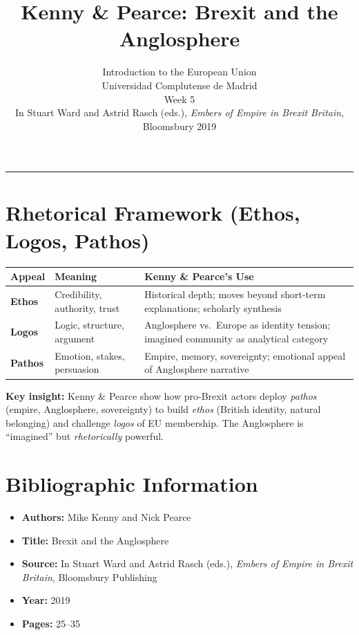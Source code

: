 \documentclass[11pt,a4paper]{article}
\begin{document}
\title{Kenny \& Pearce: Brexit and the Anglosphere}
\author{Introduction to the European Union\\Universidad Complutense de Madrid\\Week 5\\In Stuart Ward and Astrid Rasch (eds.), \textit{Embers of Empire in Brexit Britain}, Bloomsbury 2019}
\date{}
\maketitle
\vspace{-1em}
\hrule
\vspace{1em}

\section*{Rhetorical Framework (Ethos, Logos, Pathos)}

\begin{table}[h]
\centering
\begin{tabular}{@{}lll@{}}
\toprule
\textbf{Appeal} & \textbf{Meaning} & \textbf{Kenny \& Pearce's Use} \\
\midrule
\textbf{Ethos} & Credibility, authority, trust & Historical depth; moves beyond short-term explanations; scholarly synthesis \\
\textbf{Logos} & Logic, structure, argument & Anglosphere vs.\ Europe as identity tension; imagined community as analytical category \\
\textbf{Pathos} & Emotion, stakes, persuasion & Empire, memory, sovereignty; emotional appeal of Anglosphere narrative \\
\bottomrule
\end{tabular}
\end{table}

\textbf{Key insight:} Kenny \& Pearce show how pro-Brexit actors deploy \textit{pathos} (empire, Anglosphere, sovereignty) to build \textit{ethos} (British identity, natural belonging) and challenge \textit{logos} of EU membership. The Anglosphere is ``imagined'' but \textit{rhetorically} powerful.

\section*{Bibliographic Information}

\begin{itemize}
\item \textbf{Authors:} Mike Kenny and Nick Pearce
\item \textbf{Title:} Brexit and the Anglosphere
\item \textbf{Source:} In Stuart Ward and Astrid Rasch (eds.), \textit{Embers of Empire in Brexit Britain}, Bloomsbury Publishing
\item \textbf{Year:} 2019
\item \textbf{Pages:} 25--35
\end{itemize}
\end{document}
